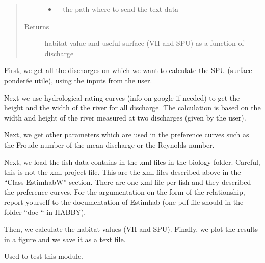 \documentclass[letterpaper,10pt,english]{sphinxmanual}
\begin{document}
\begin{fulllineitems}
\begin{quote}
\begin{description}
\begin{itemize}
\item {} 
 -- the path where to send the text data

\end{itemize}

\item[{Returns}] \leavevmode
habitat value and useful surface (VH and SPU) as a function of discharge

\end{description}\end{quote}


First, we get all the discharges on which we want to calculate the SPU (surface ponderée utile),
using the inputs from the user.

Next we use hydrological rating curves (info on google if needed) to get the height and the width of the river for
all discharge. The calculation is based on the width and height of the river measured at two discharges (given by the
user).

Next, we get other parameters which are used in the preference curves such as the Froude number of
the mean discharge or the Reynolds number.

Next, we load the fish data contains in the xml files in the biology folder. Careful, this is not the xml project
file. This are the xml files described above in the “Class EstimhabW” section. There are one xml file per fish and
they described the preference curves. For the argumentation on the form of the relationship, report yourself to the
documentation of Estimhab (one pdf file should in the folder “doc “ in HABBY).

Then, we calculate the habitat values (VH and SPU). Finally, we plot the results in a figure and we save it as
a text file.

\end{fulllineitems}


\begin{fulllineitems}
\label{\detokenize{index:src.estimhab.main}}
Used to test this module.

\end{fulllineitems}

\end{document}
